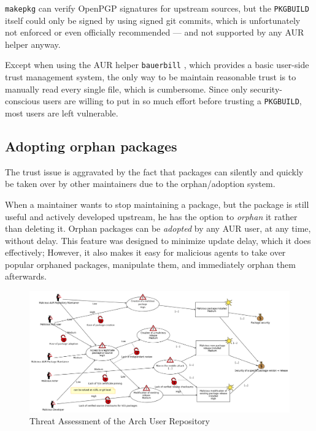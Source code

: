 \texttt{makepkg} can verify OpenPGP signatures for upstream sources, but the \texttt{PKGBUILD} itself could only be signed by using signed git commits, which is unfortunately not enforced or even officially recommended --- and not supported by any AUR helper anyway.

Except when using the AUR helper \texttt{bauerbill} \cite{bauerbill}, which provides a basic user-side trust management system, the only way to be maintain reasonable trust is to manually read every single file, which is cumbersome.
Since only security-conscious users are willing to put in so much effort before trusting a \texttt{PKGBUILD}, most users are left vulnerable.

\subsection{Adopting orphan packages}
The trust issue is aggravated by the fact that packages can silently and quickly be taken over by other maintainers due to the orphan/adoption system.

When a maintainer wants to stop maintaining a package, but the package is still useful and actively developed upstream, he has the option to \emph{orphan} it rather than deleting it.
Orphan packages can be \emph{adopted} by any AUR user, at any time, without delay.
This feature was designed to minimize update delay, which it does effectively; However, it also makes it easy for malicious agents to take over popular orphaned packages, manipulate them, and immediately orphan them afterwards.

\begin{center}
\begin{figure}
	\includegraphics[width=\textwidth,trim={0 0 245 0},clip]{img/threat.png}
	\caption[Threat Assessment]{Threat Assessment of the Arch User Repository}
	\label{fig:threat}
\end{figure}
\end{center}

